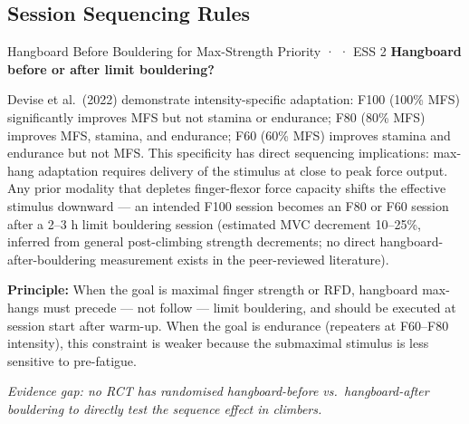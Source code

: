 \subsection{Session Sequencing Rules}
\label{subsec:sequencing}

\begin{bioplausbox}{Hangboard Before Bouldering for Max-Strength Priority · \bioplausible · ESS 2}
\textbf{Hangboard before or after limit bouldering?}

Devise et al.\ (2022) demonstrate intensity-specific adaptation: F100 (100\% MFS) significantly improves MFS but not stamina or endurance; F80 (80\% MFS) improves MFS, stamina, and endurance; F60 (60\% MFS) improves stamina and endurance but not MFS. This specificity has direct sequencing implications: max-hang adaptation requires delivery of the stimulus at close to peak force output. Any prior modality that depletes finger-flexor force capacity shifts the effective stimulus downward — an intended F100 session becomes an F80 or F60 session after a 2–3 h limit bouldering session (estimated MVC decrement 10–25\%, inferred from general post-climbing strength decrements; no direct hangboard-after-bouldering measurement exists in the peer-reviewed literature).

\textbf{Principle:} When the goal is maximal finger strength or RFD, hangboard max-hangs must precede — not follow — limit bouldering, and should be executed at session start after warm-up. When the goal is endurance (repeaters at F60–F80 intensity), this constraint is weaker because the submaximal stimulus is less sensitive to pre-fatigue.

\textit{Evidence gap: no RCT has randomised hangboard-before vs.\ hangboard-after bouldering to directly test the sequence effect in climbers.}
\end{bioplausbox}

